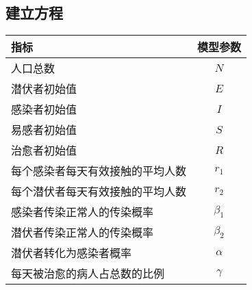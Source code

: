 \documentclass[lang=cn,11pt]{elegantpaper}
\begin{document}
\subsection{建立方程}
\begin{center}	
    \begin{tabular}{l c}
       \hline
     指标 & 模型参数 \\
       \hline
     人口总数   & $N$\\
     潜伏者初始值& $E$\\
     感染者初始值& $I$\\
     易感者初始值& $S$\\
     治愈者初始值& $R$ \\
     每个感染者每天有效接触的平均人数&$r_1$\\
     每个潜伏者每天有效接触的平均人数&$r_2$\\
     感染者传染正常人的传染概率&$\beta_1$\\
     潜伏者传染正常人的传染概率&$\beta_2$\\
     潜伏者转化为感染者概率&$\alpha$ \\
     每天被治愈的病人占总数的比例&$\gamma$\\    
      \hline
    \end{tabular}
 \end{center}
 
\end{document}
